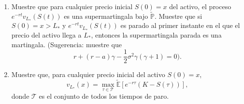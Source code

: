 \documentclass[letterpaper]{article}
\newcommand{\E}{\mathbb{E}}
\renewcommand{\P}{\mathbb{P}}
\newcommand{\1}{\mathds{1}}
\theoremstyle{definition}
\theoremstyle{definition}
\theoremstyle{definition}
\theoremstyle{definition}
\theoremstyle{definition}
\begin{document}
\begin{itemize}
\begin{enumerate}
\begin{proof}
         \end{proof}
        \item Muestre que para cualquier precio inicial $S(0)=x$ del activo, el proceso $e^{-rt}v_{L_*}(S(t))$ es una 
        supermartingala bajo $\widetilde{\P}$. Muestre que si $S(0)=x>L_*$ y $e^{-rt}v_{L_*}(S(t))$ es 
        parado al primer instante en el que el precio del activo llega a $L_*$, entonces 
        la supermartingala parada es una martingala. (Sugerencia: muestre que 
        \[
        r+(r-a)\gamma-\frac{1}{2}\sigma^2\gamma(\gamma+1)=0).  
        \]
        \item Muestre que, para cualquier precio inicial del activo $S(0)=x$, 
        \[
        v_{L_*}(x)=\max_{\tau \in \mathcal{T}}\widetilde{\E}\left[e^{-r\tau}(K-S(\tau))\right],    
        \]
        donde $\mathcal{T}$ es el conjunto de todos los tiempos de paro.
    \end{enumerate}
    \end{itemize}
\end{document}
